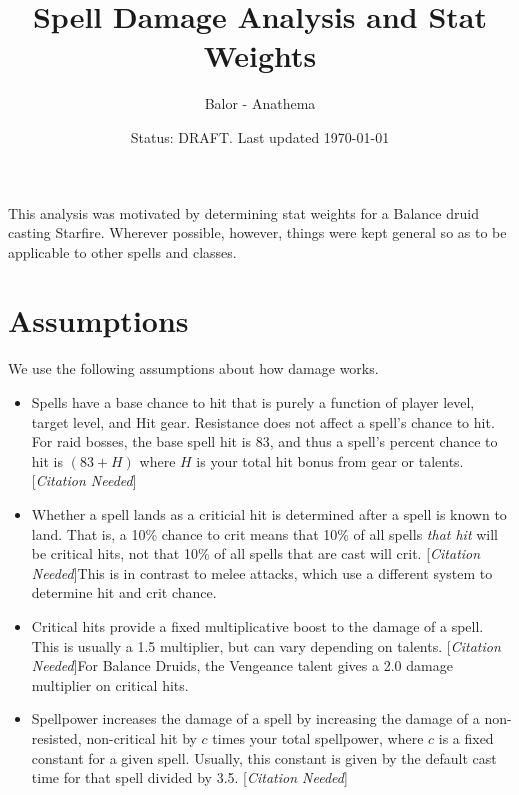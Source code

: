 \documentclass[letterpaper]{article}
\title{Spell Damage Analysis and Stat Weights}
\author{Balor - Anathema}
\date{Status: DRAFT. Last updated \today}
\theoremstyle{definition}
\providecommand{\needscite}{[\textit{Citation Needed}]}
\begin{document}
\maketitle
This analysis was motivated by determining stat weights for a Balance druid casting Starfire. Wherever possible, however, things were kept general so as to be applicable to other spells and classes.
\section{Assumptions}
We use the following assumptions about how damage works.
\begin{itemize}
	\item Spells have a base chance to hit that is purely a function of player level, target level, and Hit gear. Resistance does not affect a spell's chance to hit. For raid bosses, the base spell hit is 83, and thus a spell's percent chance to hit is $(83 + H)$ where $H$ is your total hit bonus from gear or talents.\needscite
	\item Whether a spell lands as a criticial hit is determined after a spell is known to land. That is, a 10\% chance to crit means that 10\% of all spells \textit{that hit} will be critical hits, not that 10\% of all spells that are cast will crit. \needscite This is in contrast to melee attacks, which use a different system to determine hit and crit chance.
	\item Critical hits provide a fixed multiplicative boost to the damage of a spell. This is usually a 1.5 multiplier, but can vary depending on talents. \needscite For Balance Druids, the Vengeance talent gives a 2.0 damage multiplier on critical hits.
	\item Spellpower increases the damage of a spell by increasing the damage of a non-resisted, non-critical hit by $c$ times your total spellpower, where $c$ is a fixed constant for a given spell. Usually, this constant is given by the default cast time for that spell divided by 3.5. \needscite
\end{itemize}
\end{document}
